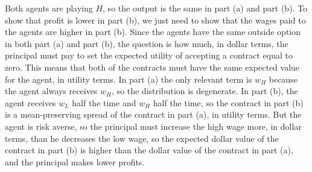 \begin{enumerate}[label=\alph*)]
  Both agents are playing $H$, so the output is the same in part (a) and part (b). To show that profit is lower in part (b), we just need to show that the wages paid to the agents are higher in part (b). Since the agents have the same outside option in both part (a) and part (b), the question is how much, in dollar terms, the principal must pay to set the expected utility of accepting a contract equal to zero. This means that both of the contracts must have the same expected value for the agent, in utility terms. In part (a) the only relevant term is $w_H$ because the agent always receives $w_H$, so the distribution is degenerate. In part (b), the agent receives $w_L$ half the time and $w_H$ half the time, so the contract in part (b) is a mean-preserving spread of the contract in part (a), in utility terms. But the agent is risk averse, so the principal must increase the high wage more, in dollar terms, than he decreases the low wage, so the expected dollar value of the contract in part (b) is higher than the dollar value of the contract in part (a), and the principal makes lower profits.

\end{enumerate}
